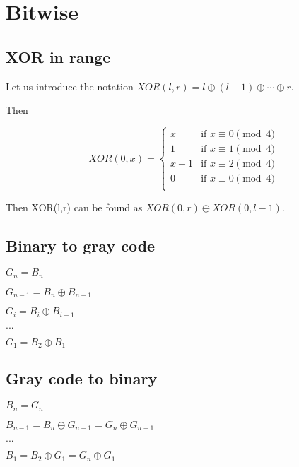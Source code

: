 \section{Bitwise}

\subsection{XOR in range}

Let us introduce the notation $XOR(l,r)=l \oplus (l+1) \oplus \cdots \oplus r$.

Then 

\begin{equation}
  XOR(0, x) = 
  \begin{cases}
    x & \text{if } x \equiv 0 \pmod{4} \\
    1 & \text{if } x \equiv 1 \pmod{4} \\
    x + 1 & \text{if } x \equiv 2 \pmod{4} \\
    0 & \text{if } x \equiv 0 \pmod{4} \\
  \end{cases}
\end{equation}


Then XOR(l,r) can be found as $XOR(0,r) \oplus XOR(0,l−1)$.


\subsection{Binary to gray code}

$G_n = B_n$

$G_{n-1} = B_n \oplus B_{n-1} $

$G_{i} = B_i \oplus B_{i-1} $

$ ... $

$ G_1 = B_2 \oplus B_1 $

\subsection{Gray code to binary}


$ B_n = G_n $

$ B_{n-1} = B_n \oplus G_{n-1} = G_n \oplus G_{n-1} $

$ ... $

$ B_1 = B_2 \oplus G_1 = G_n \oplus G_1 $
